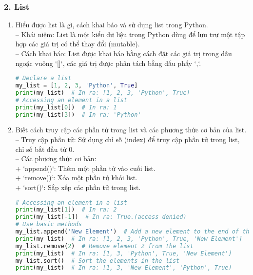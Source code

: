 \subsubsection*{2. List}
\begin{enumerate}[label=\alph*.]
    \item Hiểu được list là gì, cách khai báo và sử dụng list trong Python.\\
    -- Khái niệm: List là một kiểu dữ liệu trong Python dùng để lưu trữ một tập hợp các giá trị có thể thay đổi (mutable).\\
    -- Cách khai báo: List được khai báo bằng cách đặt các giá trị trong dấu ngoặc vuông `[]`, các giá trị được phân tách bằng dấu phẩy `,`.
    \begin{lstlisting}[language=Python]
# Declare a list
my_list = [1, 2, 3, 'Python', True]
print(my_list)  # In ra: [1, 2, 3, 'Python', True]
# Accessing an element in a list
print(my_list[0])  # In ra: 1
print(my_list[3])  # In ra: 'Python'
    \end{lstlisting}
    \vspace{-4.5em}
    \item Biết cách truy cập các phần tử trong list và các phương thức cơ bản của list.\\
    -- Truy cập phần tử: Sử dụng chỉ số (index) để truy cập phần tử trong list, chỉ số bắt đầu từ 0.\\
    -- Các phương thức cơ bản:\\
        + `append()`: Thêm một phần tử vào cuối list.\\
        + `remove()`: Xóa một phần tử khỏi list.\\
        + `sort()`: Sắp xếp các phần tử trong list.
    \begin{lstlisting}[language=Python]
# Accessing an element in a list
print(my_list[1])  # In ra: 2
print(my_list[-1])  # In ra: True.(access denied)
# Use basic methods
my_list.append('New Element')  # Add a new element to the end of the list.
print(my_list)  # In ra: [1, 2, 3, 'Python', True, 'New Element']
my_list.remove(2)  # Remove element 2 from the list
print(my_list)  # In ra: [1, 3, 'Python', True, 'New Element']
my_list.sort()  # Sort the elements in the list
print(my_list)  # In ra: [1, 3, 'New Element', 'Python', True]
    \end{lstlisting}
\end{enumerate}
\vspace*{-6.5em}
